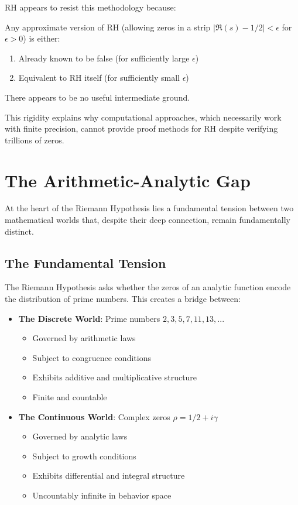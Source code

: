 RH appears to resist this methodology because:

\begin{theorem}
Any approximate version of RH (allowing zeros in a strip $|\Re(s) - 1/2| < \epsilon$ for $\epsilon > 0$) is either:
\begin{enumerate}
\item Already known to be false (for sufficiently large $\epsilon$)
\item Equivalent to RH itself (for sufficiently small $\epsilon$)
\end{enumerate}
There appears to be no useful intermediate ground.
\end{theorem}

This rigidity explains why computational approaches, which necessarily work with finite precision, cannot provide proof methods for RH despite verifying trillions of zeros.

\section{The Arithmetic-Analytic Gap}
\label{sec:arithmetic_analytic_gap}

At the heart of the Riemann Hypothesis lies a fundamental tension between two mathematical worlds that, despite their deep connection, remain fundamentally distinct.

\subsection{The Fundamental Tension}
\label{subsec:fundamental_tension}

The Riemann Hypothesis asks whether the zeros of an analytic function encode the distribution of prime numbers. This creates a bridge between:

\begin{itemize}
\item \textbf{The Discrete World}: Prime numbers $2, 3, 5, 7, 11, 13, ...$
  \begin{itemize}
  \item Governed by arithmetic laws
  \item Subject to congruence conditions  
  \item Exhibits additive and multiplicative structure
  \item Finite and countable
  \end{itemize}

\item \textbf{The Continuous World}: Complex zeros $\rho = 1/2 + i\gamma$
  \begin{itemize}
  \item Governed by analytic laws
  \item Subject to growth conditions
  \item Exhibits differential and integral structure
  \item Uncountably infinite in behavior space
  \end{itemize}
\end{itemize}

